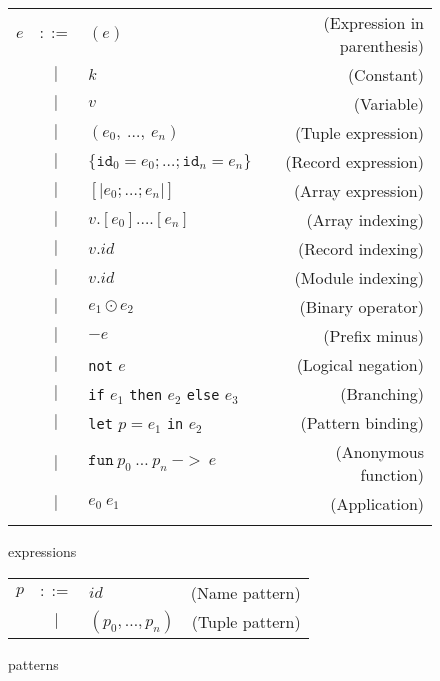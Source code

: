 \begin{figure}[h]
  \centering
  \begin{tabular}{lclr}
    $e$ & $::=$ & $(e)$ & (Expression in parenthesis) \\
        & $|$   & $k$ & (Constant) \\
        & $|$   & $v$ & (Variable) \\
        & $|$   & $(e_0,~\ldots,~e_n)$ & (Tuple expression) \\
        & $|$   & $\{\texttt{id}_0=e_0 ; \ldots ; \texttt{id}_n=e_n\}$ & (Record expression) \\
        & $|$   & $[\vert e_0 ; \ldots ; e_n\vert]$ & (Array expression) \\
        & $|$   & $v.[e_0] \ldots .[e_n]$ & (Array indexing) \\
        & $|$   & $v.id$ & (Record indexing) \\
        & $|$   & $v.id$ & (Module indexing) \\
        & $|$   & $e_1 \odot e_2$ & (Binary operator) \\
        & $|$   & $-e$ & (Prefix minus) \\
        & $|$   & \texttt{not} $e$ & (Logical negation) \\
        & $|$   & \texttt{if} $e_1$ \texttt{then} $e_2$ \texttt{else} $e_3$ & (Branching) \\
        & $|$   & \texttt{let} $p = e_1$ \texttt{in} $e_2$ & (Pattern binding) \\
        & $|$   & $\mathtt{fun}~p_0~\ldots~p_n~\mathtt{->}~e$ & (Anonymous function) \\
        & $|$   & $e_0~e_1$ & (Application) \\

    \\
  \end{tabular}
  \caption{\fshark{} expressions}
\label{fig:fsharkexpressions}
\end{figure}

\begin{figure}[h]
  \centering
  \begin{tabular}{@{}lclr}
    $p$ & $::=$ & $id$ & (Name pattern) \\
        & $|$   & $(p_0, \ldots, p_n)$ & (Tuple pattern) \\
  \end{tabular}
  \caption{\fshark{} patterns}
\label{fig:fsharkpatterns}
\end{figure}



